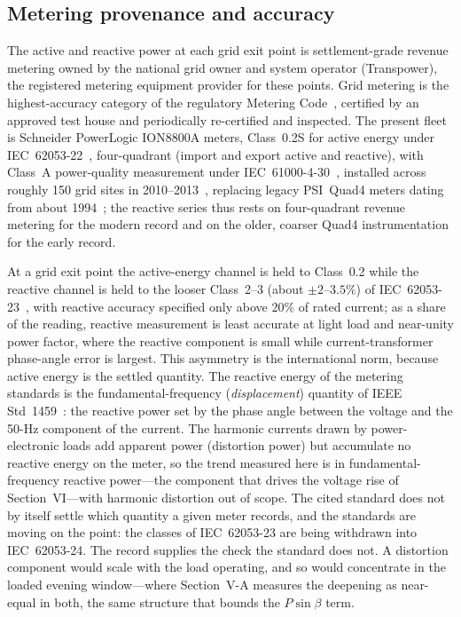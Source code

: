 \documentclass[journal]{IEEEtran}
\begin{document}
\subsection{Metering provenance and accuracy}
The active and reactive power at each grid exit point is settlement-grade revenue
metering owned by the national grid owner and system operator (Transpower), the
registered metering equipment provider for these points. Grid metering is the
highest-accuracy category of the regulatory Metering Code~\cite{eipc_part10},
certified by an approved test house and periodically re-certified and inspected. The
present fleet is Schneider PowerLogic ION8800A meters, Class~0.2S for active energy
under IEC~62053-22~\cite{iec62053_22}, four-quadrant (import and export active and
reactive), with Class~A power-quality measurement under
IEC~61000-4-30~\cite{iec61000_4_30}, installed across roughly 150 grid sites in
2010--2013~\cite{transpower_amp}, replacing legacy PSI~Quad4 meters dating from
about 1994~\cite{transpower_amp2010}; the reactive series thus rests on four-quadrant
revenue metering for the modern record and on the older, coarser Quad4
instrumentation for the early record.

At a grid exit point the active-energy channel is held to Class~0.2 while the
reactive channel is held to the looser Class~2--3 (about $\pm 2$--$3.5\%$) of
IEC~62053-23~\cite{iec62053_23}, with reactive accuracy specified only above 20\% of
rated current; as a share of the reading, reactive measurement is least
accurate at light load and near-unity power factor, where the reactive component is
small while current-transformer phase-angle error is largest. This asymmetry is the
international norm, because active energy is the settled quantity. The reactive
energy of the metering standards is the fundamental-frequency
(\emph{displacement}) quantity of IEEE Std~1459~\cite{ieee1459}: the reactive
power set by the phase angle between the voltage and the 50-Hz component of the
current. The harmonic currents
drawn by power-electronic loads add apparent power (distortion power) but
accumulate no reactive energy on the meter, so the trend measured here is in
fundamental-frequency reactive power---the component that drives the voltage rise
of Section~VI---with harmonic distortion out of scope. The cited standard does
not by itself settle which quantity a given meter records, and the standards are
moving on the point: the classes of IEC~62053-23 are being withdrawn into
IEC~62053-24. The record supplies the check the standard does not. A distortion
component would scale with the load operating, and so would concentrate in the
loaded evening window---where Section~V-A measures the deepening as near-equal
in both, the same structure that bounds the $P\sin\beta$ term.
\end{document}
